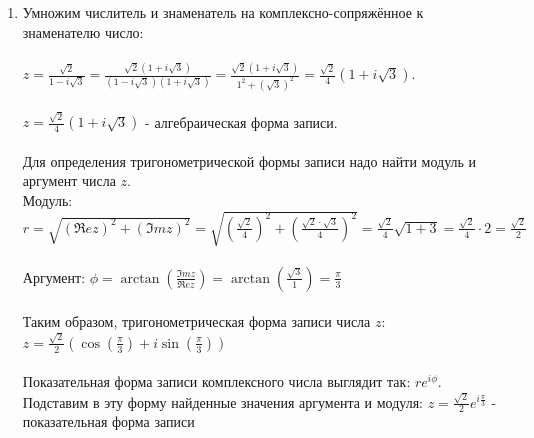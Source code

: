 \documentclass[12pt, a4paper]{article}
\begin{document}
\begin{enumerate}
    \item [а)]
        Умножим числитель и знаменатель на комплексно-сопряжённое
        к знаменателю число:\\\\
        \begin{math}
            z = \frac{\sqrt{2}}{1 - i\sqrt{3}} =
            \frac{\sqrt{2}(1 + i\sqrt{3})}{(1 - i\sqrt{3})(1 + i\sqrt{3})} =
            \frac{\sqrt{2}(1 + i\sqrt{3})}{1^2 + (\sqrt{3})^2} =
            \frac{\sqrt{2}}{4}(1 + i\sqrt{3}).
        \end{math}
        \\\\
        \begin{math}
            z = \frac{\sqrt{2}}{4}(1 + i\sqrt{3})
        \end{math}
        - алгебраическая форма записи.\\\\
        Для определения тригонометрической формы записи
        надо найти модуль и аргумент числа $z$.\\
        Модуль:
        \begin{math}
            r = \sqrt{(\Re ez)^2 + (\Im mz)^2} =
            \sqrt{(\frac{\sqrt{2}}{4})^2 + (\frac{\sqrt{2}\cdot\sqrt{3}}{4})^2} =
            \frac{\sqrt{2}}{4}\sqrt{1 + 3} =
            \frac{\sqrt{2}}{4}\cdot 2 =
            \frac{\sqrt{2}}{2}
        \end{math}
        \\\\
        Аргумент:
        \begin{math}
            \phi = \arctan(\frac{\Im mz}{\Re ez}) =
            \arctan(\frac{\sqrt{3}}{1}) =
            \frac{\pi}{3}
        \end{math}
        \\\\
        Таким образом, тригонометрическая форма записи числа $z$:\\
        $z = \frac{\sqrt{2}}{2}(\cos(\frac{\pi}{3}) + i\sin(\frac{\pi}{3}))$
        \\\\
        Показательная форма записи комплексного числа выглядит так:
        $re^{i\phi}$. Подставим в эту форму найденные значения аргумента и модуля:
        $z = \frac{\sqrt{2}}{2}e^{i\frac{\pi}{3}}$ - показательная форма записи\\\\

\end{enumerate}
\end{document}
